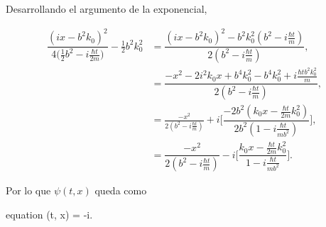 \documentclass[../main.tex]{subfiles}
\begin{document}
\begin{problema}
	Desarrollando el argumento de la exponencial,

	\begin{align*}
		\dfrac{(ix - b^{2}k_{0})^{2}}{4 \bigl(\tfrac{1}{2}b^{2} - i\tfrac{\hbar t}{2m}\bigr)} - \tfrac{1}{2}b^{2}k_{0}^{2} & = \dfrac{(ix - b^{2}k_{0})^{2} -b^{2}k_{0}^{2}(b^{2} - i\tfrac{\hbar t}{m})}{2(b^{2} - i\tfrac{\hbar t}{m})},                                                    \\
		                                                                                                                   & = \dfrac{-x^{2} - 2i^{2}k_{0}x + b^{4}k_{0}^{2} - b^{4}k_{0}^{2} + i\tfrac{\hbar t b^{2}k_{0}^{2}}{m}}{2(b^{2} - i\tfrac{\hbar t}{m})},                          \\
		                                                                                                                   & = \tfrac{-x^{2}}{2(b^{2} - i\tfrac{\hbar t}{m})} + i \Biggl[\dfrac{-2b^{2}(k_{0}x - \tfrac{\hbar t}{2m}k_{0}^{2})}{2b^{2}(1 - i\tfrac{\hbar t}{mb^{2}})}\Biggr], \\
		                                                                                                                   & = \dfrac{-x^{2}}{2(b^{2} - i\tfrac{\hbar t}{m})} - i \Biggl[\dfrac{k_{0}x - \tfrac{\hbar t}{2m}k_{0}^{2}}{1 - i\tfrac{\hbar t}{mb^{2}}}\Biggr].
	\end{align*}

	Por lo que \(\psi(t, x)\) queda como

	\begin{empheq}[box = \mainresult]{equation}
		\psi(t, x) = 
		\exp{}
		\exp\Biggl\lbrace-i\Biggr\rbrace.
		\label{eq:wave-packet-res}
	\end{empheq}
\end{problema}
\end{document}
